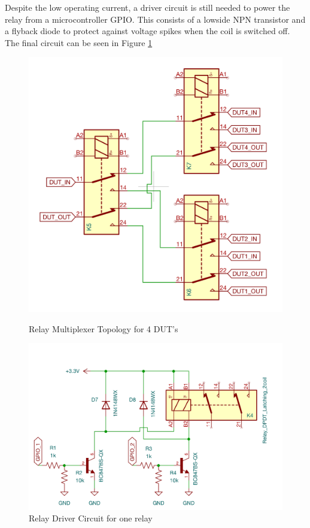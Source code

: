 Despite the low operating current, a driver circuit is still needed to power the relay from a microcontroller GPIO. This consists of a lowside NPN transistor and a flyback diode to protect against voltage spikes when the coil is switched off. The final circuit can be seen in Figure \ref{fig:relay_circuit}

\begin{figure}[H]
    \centering
    \begin{minipage}{0.35\textwidth}
        \centering
        \includegraphics[width=\textwidth]{RelayTopologySchem.png}
        \caption{Relay Multiplexer Topology for 4 DUT's}
        \label{fig:relay_topology}
    \end{minipage}\hfill
    \begin{minipage}{0.6\textwidth}
        \centering
        \includegraphics[width=\textwidth]{RelayDriverSchem.png}
        \caption{Relay Driver Circuit for one relay}
        \label{fig:relay_circuit}
    \end{minipage}
\end{figure}

